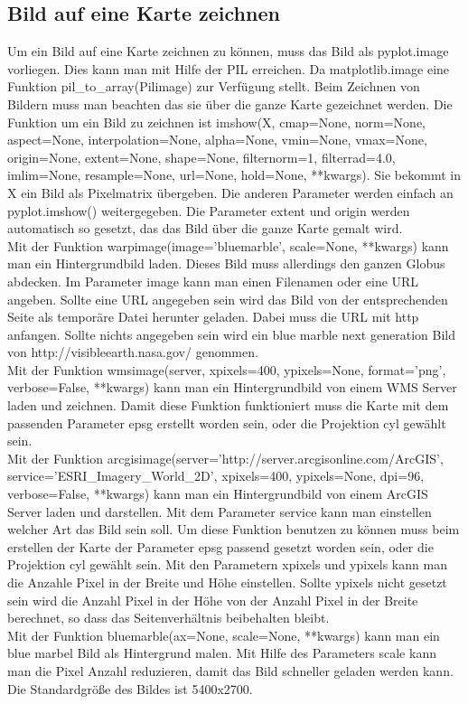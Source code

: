 \subsection{Bild auf eine Karte zeichnen}
Um ein Bild auf eine Karte zeichnen zu können, muss das Bild als \textsf{pyplot.image} vorliegen. Dies kann man mit Hilfe der \textsf{PIL} erreichen. Da \textsf{matplotlib.image} eine Funktion \textsf{pil\_to\_array(Pilimage)} zur Verfügung stellt. Beim Zeichnen von Bildern muss man beachten das sie über die ganze Karte gezeichnet werden. Die Funktion um ein Bild zu zeichnen ist \textsf{imshow(X, cmap=None, norm=None, aspect=None, interpolation=None, alpha=None, vmin=None, vmax=None, origin=None, extent=None, shape=None, filternorm=1, filterrad=4.0, imlim=None, resample=None, url=None, hold=None, **kwargs)}. Sie bekommt in \textsf{X} ein Bild als Pixelmatrix übergeben. Die anderen Parameter werden einfach an \textsf{pyplot.imshow()} weitergegeben. Die Parameter \textsf{extent} und \textsf{origin} werden automatisch so gesetzt, das das Bild über die ganze Karte gemalt wird.\\
Mit der Funktion \textsf{warpimage(image='bluemarble', scale=None, **kwargs)} kann man ein Hintergrundbild laden. Dieses Bild muss allerdings den ganzen Globus abdecken. Im Parameter \textsf{image} kann man einen Filenamen oder eine URL angeben. Sollte eine URL angegeben sein wird das Bild von der entsprechenden Seite als temporäre Datei herunter geladen. Dabei muss die URL mit \textsf{http} anfangen. Sollte nichts angegeben sein wird ein \textsf{blue marble next generation} Bild von  
\textsf{http://visibleearth.nasa.gov/} genommen.\\
Mit der Funktion \textsf{wmsimage(server, xpixels=400, ypixels=None, format='png', verbose=False, **kwargs)} kann man ein Hintergrundbild von einem WMS Server laden und zeichnen. Damit diese Funktion funktioniert muss die Karte mit dem passenden Parameter \textsf{epsg} erstellt worden sein, oder die Projektion \textsf{cyl} gewählt sein.\\
Mit der Funktion \textsf{arcgisimage(server='http://server.arcgisonline.com/ArcGIS', service='ESRI\_Imagery\_World\_2D', xpixels=400, ypixels=None, dpi=96, verbose=False, **kwargs)} kann man ein Hintergrundbild von einem ArcGIS Server laden und darstellen. Mit dem Parameter \textsf{service} kann man einstellen welcher Art das Bild sein soll. Um diese Funktion benutzen zu können muss beim erstellen der Karte der Parameter \textsf{epsg} passend gesetzt worden sein, oder die Projektion \textsf{cyl} gewählt sein. Mit den Parametern \textsf{xpixels} und \textsf{ypixels} kann man die Anzahle Pixel in der Breite und Höhe einstellen. Sollte \textsf{ypixels} nicht gesetzt sein wird die Anzahl Pixel in der Höhe von der Anzahl Pixel in der Breite berechnet, so dass das Seitenverhältnis beibehalten bleibt.\\
Mit der Funktion \textsf{bluemarble(ax=None, scale=None, **kwargs)} kann man ein \textsf{blue marbel} Bild als Hintergrund malen. Mit Hilfe des Parameters \textsf{scale} kann man die Pixel Anzahl reduzieren, damit das Bild schneller geladen werden kann. Die Standardgröße des Bildes ist 5400x2700.